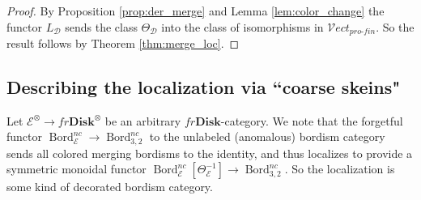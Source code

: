 \documentclass[reqno]{amsart}
\theoremstyle{definition}
\newcommand{\msc}[1]{\mathscr{#1}}
\newcommand{\ot}{\otimes}
\newcommand{\Vect}{\msc{V}\!ect}
\newcommand{\Disk}{\mathbf{Disk}}
\newcommand{\pf}{pro\text{-}fin}
\DeclareMathOperator{\Bord}{Bord}
\renewcommand{\1}{\mathbf{1}}
\begin{document}
\begin{proof}
By Proposition \ref{prop:der_merge} and Lemma \ref{lem:color_change} the functor $L_{\msc{D}}$ sends the class $\Theta_{\msc{D}}$ into the class of isomorphisms in $\Vect_{\pf}$.  So the result follows by Theorem \ref{thm:merge_loc}.
\end{proof}

\subsection{Describing the localization via ``coarse skeins"}
\label{sect:univ_sk}

Let $\msc{E}^{\ot}\to fr\Disk^{\ot}$ be an arbitrary $fr\Disk$-category.  We note that the forgetful functor $\Bord_{\msc{E}}^{nc}\to \Bord^{nc}_{3,2}$ to the unlabeled (anomalous) bordism category sends all colored merging bordisms to the identity, and thus localizes to provide a symmetric monoidal functor $\Bord_{\msc{E}}^{nc}[\Theta^{-1}_{\msc{E}}]\to \Bord_{3,2}^{nc}$.  So the localization is some kind of decorated bordism category.
\par
\end{document}
